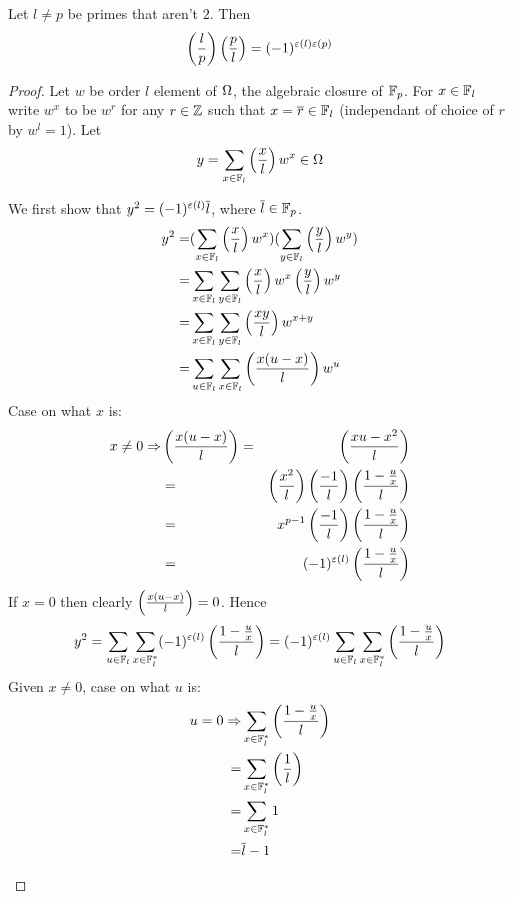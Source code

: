 \begin{prop}
    Let $l \ne p$ be primes that aren't $2$.
    Then \[\left(\frac{l}{p}\right)\left(\frac{p}{l}\right) = (-1)^{\varepsilon(l)\varepsilon(p)}\]
\end{prop}
\begin{proof}
    Let $w$ be order $l$ element of $\Omega$,
    the algebraic closure of $\mathbb{F}_p$.
    For $x \in \mathbb{F}_l$ write $w^x$ to be $w^r$ for any $r \in \mathbb{Z}$ such that
    $x = \overline{r} \in \mathbb{F}_l$ (independant of choice of $r$ by $w^l = 1$).
    Let 
    \[y = \sum_{x\in \mathbb{F}_l} \left(\frac{x}{l}\right) w^x \in \Omega\]

    We first show that $y^2 = (-1)^{\varepsilon(l)} \overline{l}$, 
    where $\overline{l} \in \mathbb{F}_p$.
    \begin{align*}
        y^2 =& 
        (\sum_{x \in \mathbb{F}_l} \left(\frac{x}{l}\right) w^x)
        (\sum_{y \in \mathbb{F}_l} \left(\frac{y}{l}\right) w^y)\\
        =& \sum_{x \in \mathbb{F}_l} \sum_{y \in \mathbb{F}_l} 
        \left(\frac{x}{l}\right) w^x \left(\frac{y}{l}\right) w^y\\
        =& \sum_{x \in \mathbb{F}_l} \sum_{y \in \mathbb{F}_l} \left(\frac{xy}{l}\right) w^{x+y}\\
        =& \sum_{u \in \mathbb{F}_l} \sum_{x \in \mathbb{F}_l} \left(\frac{x(u - x)}{l}\right) w^u
    \end{align*}
    Case on what $x$ is:
    \begin{align*}
        x \ne 0 \Rightarrow& \left(\frac{x(u - x)}{l}\right) =& \left(\frac{xu - x^2}{l}\right)\\
            & =& \left(\frac{x^2}{l}\right) \left(\frac{-1}{l}\right) \left(\frac{1-\frac{u}{x}}{l}\right)\\
            & =& x^{p - 1} \left(\frac{-1}{l}\right) \left(\frac{1 - \frac{u}{x}}{l}\right)\\
            & =& (-1)^{\varepsilon(l)} \left(\frac{1 - \frac{u}{x}}{l}\right)
    \end{align*}
    If $x = 0$ then clearly $\left(\frac{x(u - x)}{l}\right) = 0$.
    Hence 
    \[
        y^2 = \sum_{u \in \mathbb{F}_l} \sum_{x \in \mathbb{F}_l^*} 
        (-1)^{\varepsilon(l)} \left(\frac{1 - \frac{u}{x}}{l}\right)
        = (-1)^{\varepsilon(l)} \sum_{u \in \mathbb{F}_l}  \sum_{x \in \mathbb{F}_l^*}
        \left(\frac{1 - \frac{u}{x}}{l}\right)
    \]
    Given $x \ne 0$, case on what $u$ is:
    \begin{align*}
        u = 0 \Rightarrow &\sum_{x \in \mathbb{F}_l^*} \left(\frac{1 - \frac{u}{x}}{l}\right) \\
        = &\sum_{x \in \mathbb{F}_l^*} \left(\frac{1}{l}\right) \\
        = &\sum_{x \in \mathbb{F}_l^*} 1\\
        = & \overline{l} -1
    \end{align*}
    \begin{align*}

\end{align*}
\end{proof}
